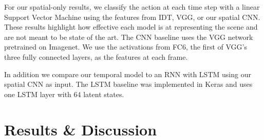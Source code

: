 \documentclass[runningheads]{llncs}
\begin{document}
For our spatial-only results, we classify the action at each time step with a linear Support Vector Machine using the features from IDT, VGG, or our spatial CNN. These results highlight how effective each model is at representing the scene and are not meant to be state of the art.  
The CNN baseline uses the VGG network~\cite{VGG} pretrained on Imagenet. 
We use the activations from FC6, the first of VGG's three fully connected layers, as the features at each frame.

In addition we compare our temporal model to an RNN with LSTM using our spatial CNN as input. 
The LSTM baseline was implemented in Keras and uses one LSTM layer with 64 latent states. 


 \section{Results \& Discussion}
\label{sec:discussion}
\end{document}
